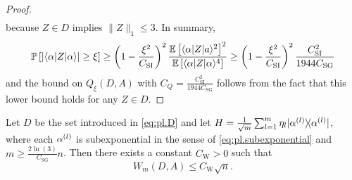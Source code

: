 \begin{proof}
\begin{align}
\end{align}
because $ Z \in D$ implies $\|  Z \|_1 \leq 3$.
In summary,
\begin{align}
  \mathbb{P} \left[ | \langle  \alpha|  Z | \alpha \rangle| \geq \xi \right]
  \geq \left(1-\frac{\xi^2}{C_\mathrm{SI}}\right)^2 \frac{\mathbb{E} \left[ \langle  \alpha|  Z | a \rangle^2 \right]^2}{\mathbb{E} \left[ \langle  \alpha|  Z | \alpha \rangle^4 \right]}
  \geq \left(1-\frac{\xi^2}{C_\mathrm{SI}}\right)^2 \frac{C_\mathrm{SI}^2}{1944C_\mathrm{SG}}
\end{align}
and the bound on $Q_\xi (D, A)$ with $C_Q = \frac{C_\mathrm{SI}^2}{1944 C_\mathrm{SG}}$ follows from the fact that this lower bound holds for any $ Z \in D$.
\end{proof}



\begin{lemma}
  Let $D$ be the set introduced in \cref{eq:pl.D} and let $ H = \frac{1}{\sqrt{m}} \sum_{l=1}^m \eta_l \ketbra{\alpha\ind{l}}$, where each $\alpha^{(l)}$ is subexponential in the sense of \eqref{eq:pl.subexponential} and $m \geq \frac{2 \ln (3)}{C_\mathrm{SG}} n$.
  Then there exists a constant $C_\mathrm{W} >0$ such that
  \[
    W_m (D, A) \leq C_\mathrm{W} \sqrt{n}.
  \]
\end{lemma}


